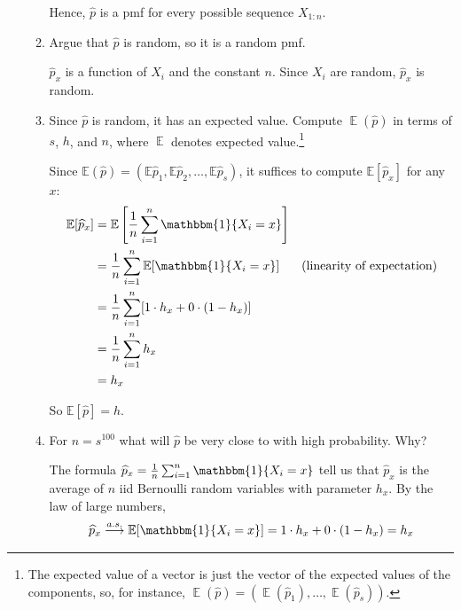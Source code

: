 \documentclass[12pt]{article}
\renewcommand{\hat}[1]{\widehat{#1}}
\newcommand{\E}{\mathbb{E}}
\newcommand{\ind}{\mathbbm{1}}
\DeclareMathOperator{\Exp}{\mathbb{E}}
\begin{document}
\begin{enumerate}[1.]
\begin{enumerate}
		            Hence, $\hat p$ is a pmf for every possible sequence $X_{1:n}$.
		            \color{black}

		      \item Argue that $\widehat p$ is random, so it is a random pmf.

		            \color{blue}
		            $\hat p_x$ is a function of $X_i$ and the constant $n$. Since $X_i$ are random, $\hat p_x$ is random.
		            \color{black}

		      \item Since $\widehat p$ is random, it has an expected value. Compute $\Exp(\widehat p)$ in terms of $s$, $h$, and $n$, where $\Exp$ denotes expected value.\footnote{The expected value of a vector is just the vector of the expected values of the components, so, for instance, $\Exp(\widehat p) = (\Exp(\widehat p_1),\dotsc,\Exp(\widehat p_s))$.}

		            \color{blue}
		            Since $\E(\hat p) = (\E \hat p_1, \E \hat p_2, \dots, \E \hat p_s)$, it suffices to compute $\E [\hat p_x]$ for any $x$:
		            \begin{align*}
			            \E [\hat p_x] & = \E\left[\frac{1}{n} \sum_{i=1}^n \ind\{X_i = x\}\right]                                        \\
			                          & = \frac{1}{n} \sum_{i=1}^n \E[\ind\{X_i = x\}]               & (\text{linearity of expectation}) \\
			                          & = \frac{1}{n} \sum_{i=1}^n [1 \cdot h_x + 0 \cdot (1 - h_x)]                                     \\
			                          & = \frac{1}{n} \sum_{i=1}^n h_x                                                                   \\
			                          & = h_x
		            \end{align*}

		            So $\E[\hat p] = h$.
		            \color{black}

		      \item For $n=s^{100}$ what will $\widehat p$ be very close to with high probability. Why?

		            \color{blue}
		            The formula $\hat p_x = \frac{1}{n }\sum_{i=1}^n \ind\{X_i = x\}$ tell us that $\hat p_x$ is the average of $n$ iid Bernoulli random variables with parameter $h_x$. By the law of large numbers,
		            \[\hat p_x \overset{a.s.}{\longrightarrow} \E[\ind\{X_i = x\}] = 1 \cdot h_x + 0 \cdot (1 - h_x) = h_x\]


\end{enumerate}
\end{enumerate}
\end{document}

